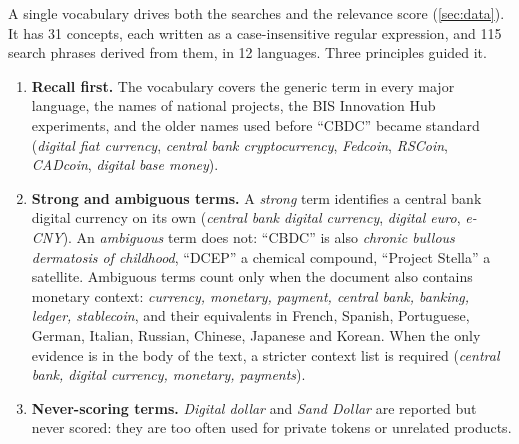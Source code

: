 \documentclass[11pt,a4paper]{article}
\begin{document}
A single vocabulary drives both the searches and the relevance score (\cref{sec:data}). It has 31 concepts, each written as a case-insensitive regular expression, and 115 search phrases derived from them, in 12 languages. Three principles guided it.

\begin{enumerate}
\item \textbf{Recall first.} The vocabulary covers the generic term in every major language, the names of national projects, the BIS Innovation Hub experiments, and the older names used before ``CBDC'' became standard (\emph{digital fiat currency}, \emph{central bank cryptocurrency}, \emph{Fedcoin}, \emph{RSCoin}, \emph{CADcoin}, \emph{digital base money}).
\item \textbf{Strong and ambiguous terms.} A \emph{strong} term identifies a central bank digital currency on its own (\emph{central bank digital currency}, \emph{digital euro}, \emph{e-CNY}). An \emph{ambiguous} term does not: ``CBDC'' is also \emph{chronic bullous dermatosis of childhood}, ``DCEP'' a chemical compound, ``Project Stella'' a satellite. Ambiguous terms count only when the document also contains monetary context: \emph{currency, monetary, payment, central bank, banking, ledger, stablecoin}, and their equivalents in French, Spanish, Portuguese, German, Italian, Russian, Chinese, Japanese and Korean. When the only evidence is in the body of the text, a stricter context list is required (\emph{central bank, digital currency, monetary, payments}).
\item \textbf{Never-scoring terms.} \emph{Digital dollar} and \emph{Sand Dollar} are reported but never scored: they are too often used for private tokens or unrelated products.
\end{enumerate}
\end{document}
